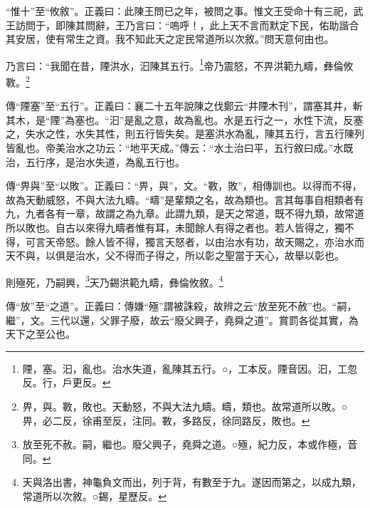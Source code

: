 {\noindent\shu{}\fzkt “惟十”至“攸敘”。正義曰：此陳王問已之年，被問之事。惟文王受命十有三祀，武王訪問于，即陳其問辭，王乃言曰：“嗚呼！，此上天不言而默定下民，佑助諧合其安居，使有常生之資。我不知此天之定民常道所以次敘。”問天意何由也。 \par}

乃言曰：“我聞在昔，陻洪水，汩陳其五行。\footnote{陻，塞。汩，亂也。治水失道，亂陳其五行。○，工本反。陻音因。汩，工忽反。行，戶更反。}帝乃震怒，不畀洪範九疇，彝倫攸斁。\footnote{畀，與。斁，敗也。天動怒，不與大法九疇。疇，類也。故常道所以敗。○畀，必二反，徐甫至反，注同。斁，多路反，徐同路反，敗也。}


{\noindent\zhuan{}\fzbyks 傳“陻塞”至“五行”。正義曰：襄二十五年說陳之伐鄭云“井陻木刊”，謂塞其井，斬其木，是“陻”為塞也。“汩”是亂之意，故為亂也。水是五行之一，水性下流，反塞之，失水之性，水失其性，則五行皆失矣。是塞洪水為亂，陳其五行，言五行陳列皆亂也。帝美治水之功云：“地平天成。”傳云：“水土治曰平，五行敘曰成。”水既治，五行序，是治水失道，為亂五行也。 \par}

{\noindent\zhuan{}\fzbyks 傳“畀與”至“以敗”。正義曰：“畀，與”，文。“斁，敗”，相傳訓也。以得而不得，故為天動威怒，不與大法九疇。“疇”是輩類之名，故為類也。言其每事自相類者有九，九者各有一章，故謂之為九章。此謂九類，是天之常道，既不得九類，故常道所以敗也。自古以來得九疇者惟有耳，未聞餘人有得之者也。若人皆得之，獨不得，可言天帝怒。餘人皆不得，獨言天怒者，以由治水有功，故天賜之，亦治水而天不與，以俱是治水，父不得而子得之，所以彰之聖當于天心，故舉以彰也。 \par}

則殛死，乃嗣興，\footnote{放至死不赦。嗣，繼也。廢父興子，堯舜之道。○殛，紀力反，本或作極，音同。}天乃錫洪範九疇，彝倫攸敘。\footnote{天與洛出書，神龜負文而出，列于背，有數至于九。遂因而第之，以成九類，常道所以次敘。○錫，星歷反。}

{\noindent\zhuan{}\fzbyks 傳“放”至“之道”。正義曰：傳嫌“殛”謂被誅殺，故辨之云“放至死不赦”也。“嗣，繼”，文。三代以還，父罪子廢，故云“廢父興子，堯舜之道”。賞罰各從其實，為天下之至公也。 \par}

